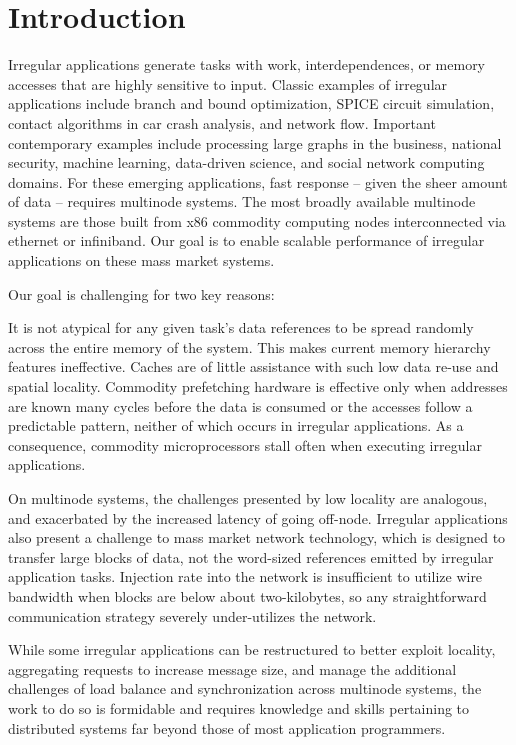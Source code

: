 \section{Introduction} \label{sec:intro}

Irregular applications generate tasks with work, interdependences, or memory
accesses that are highly sensitive to input. Classic examples of irregular
applications include branch and bound optimization, SPICE circuit simulation,
contact algorithms in car crash analysis, and network flow. Important
contemporary examples include processing large graphs in the business,
national security, machine learning, data-driven science, and social network
computing domains. For these emerging applications, fast response -- given the
sheer amount of data -- requires multinode systems. The most broadly available
multinode systems are those built from x86 commodity computing nodes
interconnected via ethernet or infiniband. Our goal is to enable scalable
performance of irregular applications on these mass market systems.

Our goal is challenging for two key reasons: 

It is not atypical for any given task's data references to be spread
randomly across the entire memory of the system. This makes current
memory hierarchy features ineffective. Caches are of little assistance
with such low data re-use and spatial locality. Commodity prefetching
hardware is effective only when addresses are known many cycles before
the data is consumed or the accesses follow a predictable pattern,
neither of which occurs in irregular applications. As a consequence,
commodity microprocessors stall often when executing irregular
applications.

 On multinode systems, the challenges presented by low
locality are analogous, and exacerbated by the increased latency of going
off-node. Irregular applications also present a challenge to mass market
network technology, which is designed to transfer large blocks of data, not
the word-sized references emitted by irregular application tasks. Injection
rate into the network is insufficient to utilize wire bandwidth when blocks
are below about two-kilobytes, so any straightforward communication strategy
severely under-utilizes the network. 

While some irregular applications can be restructured to better exploit
locality, aggregating requests to increase message size, and manage the
additional challenges of load balance and synchronization across multinode
systems, the work to do so is formidable and requires knowledge and skills
pertaining to distributed systems far beyond those of most application
programmers.

